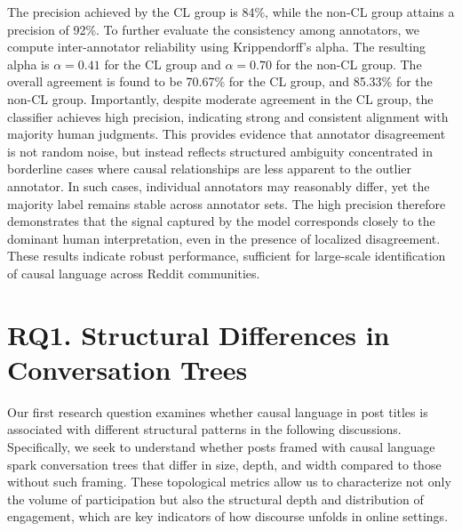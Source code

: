 \documentclass[acmsmall]{acmart}
\begin{document}
The precision achieved by the CL group is 84\%, while the non-CL group attains a precision of 92\%. To further evaluate the consistency among annotators, we compute inter-annotator reliability using Krippendorff’s alpha. The resulting alpha is $\alpha = 0.41$ for the CL group and  $\alpha = 0.70$ for the non-CL group. The overall agreement is found to be 70.67\% for the CL group, and 85.33\% for the non-CL group. Importantly, despite moderate agreement in the CL group, the classifier achieves high precision, indicating strong and consistent alignment with majority human judgments. This provides evidence that annotator disagreement is not random noise, but instead reflects structured ambiguity concentrated in borderline cases where causal relationships are less apparent to the outlier annotator. In such cases, individual annotators may reasonably differ, yet the majority label remains stable across annotator sets. The high precision therefore demonstrates that the signal captured by the model corresponds closely to the dominant human interpretation, even in the presence of localized disagreement. These results indicate robust performance, sufficient for large-scale identification of causal language across Reddit communities.







\section{RQ1. Structural Differences in Conversation Trees}

Our first research question examines whether causal language in post titles is associated with different structural patterns in the following discussions. Specifically, we seek to understand whether posts framed with causal language spark conversation trees that differ in size, depth, and width compared to those without such framing. These topological metrics allow us to characterize not only the volume of participation but also the structural depth and distribution of engagement, which are key indicators of how discourse unfolds in online settings.
\end{document}
